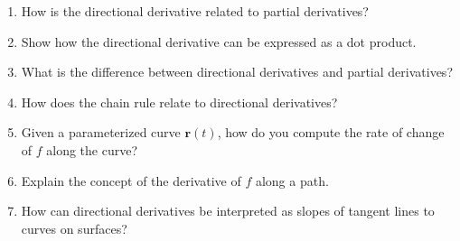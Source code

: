 \begin{enumerate}
  \item How is the directional derivative related to partial derivatives?
  \item Show how the directional derivative can be expressed as a dot product.
  \item What is the difference between directional derivatives and partial derivatives?
  \item How does the chain rule relate to directional derivatives?
  \item Given a parameterized curve $\mathbf{r}(t)$, how do you compute the rate of change of $f$ along the curve?
  \item Explain the concept of the derivative of $f$ along a path.
  \item How can directional derivatives be interpreted as slopes of tangent lines to curves on surfaces?
\end{enumerate}
